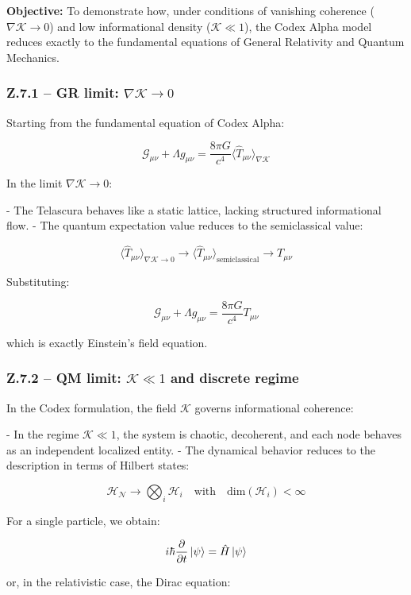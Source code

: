 \documentclass[12pt]{article}
\begin{document}
\textbf{Objective:} To demonstrate how, under conditions of vanishing coherence ($\nabla \mathcal{K} \to 0$) and low informational density ($\mathcal{K} \ll 1$), the Codex Alpha model reduces exactly to the fundamental equations of General Relativity and Quantum Mechanics.

\subsubsection*{Z.7.1 – GR limit: $\nabla \mathcal{K} \to 0$}

Starting from the fundamental equation of Codex Alpha:

\[
\mathcal{G}_{\mu\nu} + \Lambda g_{\mu\nu} = \frac{8\pi G}{c^4} \langle \hat{T}_{\mu\nu} \rangle_{\nabla \mathcal{K}}
\]

In the limit $\nabla \mathcal{K} \to 0$:

- The Telascura behaves like a static lattice, lacking structured informational flow.
- The quantum expectation value reduces to the semiclassical value:

\[
\langle \hat{T}_{\mu\nu} \rangle_{\nabla \mathcal{K} \to 0} \to \langle \hat{T}_{\mu\nu} \rangle_{\text{semiclassical}} \to T_{\mu\nu}
\]

Substituting:

\[
\mathcal{G}_{\mu\nu} + \Lambda g_{\mu\nu} = \frac{8\pi G}{c^4} T_{\mu\nu}
\]

which is exactly Einstein’s field equation.

\subsubsection*{Z.7.2 – QM limit: $\mathcal{K} \ll 1$ and discrete regime}

In the Codex formulation, the field $\mathcal{K}$ governs informational coherence:

- In the regime $\mathcal{K} \ll 1$, the system is chaotic, decoherent, and each node behaves as an independent localized entity.
- The dynamical behavior reduces to the description in terms of Hilbert states:

\[
\mathcal{H}_\mathcal{N} \to \bigotimes_i \mathcal{H}_i \quad \text{with} \quad \text{dim}(\mathcal{H}_i) < \infty
\]

For a single particle, we obtain:

\[
i\hbar \frac{\partial}{\partial t} \ket{\psi} = \hat{H} \ket{\psi}
\]

or, in the relativistic case, the Dirac equation:
\end{document}
